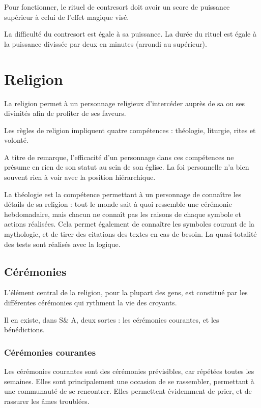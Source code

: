 \documentclass[10pt,a4paper,twocolumn]{book}
\begin{document}
Pour fonctionner, le rituel de contresort doit avoir un score de puissance supérieur à celui de l'effet magique visé.

La difficulté du contresort est égale à sa puissance. La durée du rituel est égale à la puissance divissée par deux en minutes (arrondi au supérieur).
\chapter{Religion}
La religion permet à un personnage religieux d'intercéder auprès de sa ou ses divinités afin de profiter de ses faveurs.

Les règles de religion impliquent quatre compétences : théologie, liturgie, rites et volonté.

A titre de remarque, l'efficacité d'un personnage dans ces compétences ne présume en rien de son statut au sein de son église. La foi personnelle n'a bien souvent rien à voir avec la position hiérarchique. 

La théologie est la compétence permettant à un personnage de connaître les détails de sa religion : tout le monde sait à quoi ressemble une cérémonie hebdomadaire, mais chacun ne connaît pas les raisons de chaque symbole et actions réalisées. Cela permet également de connaître les symboles courant de la mythologie, et de tirer des citations des textes en cas de besoin. La quasi-totalité des tests sont réalisés avec la logique.
\section{Cérémonies}
L'élément central de la religion, pour la plupart des gens, est constitué par les différentes cérémonies qui rythment la vie des croyants.

Il en existe, dans S\& A, deux sortes : les cérémonies courantes, et les bénédictions.

\subsection*{Cérémonies courantes}
Les cérémonies courantes sont des cérémonies prévisibles, car répétées toutes les semaines. Elles sont principalement une occasion de se rassembler, permettant à une communauté de se rencontrer. Elles permettent évidemment de prier, et de rassurer les âmes troublées.
\end{document}

